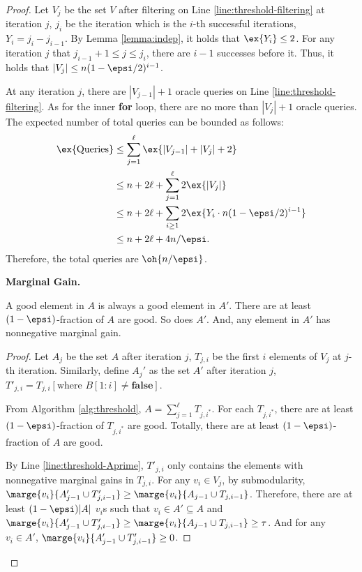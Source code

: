 \begin{proof}
Let $V_j$ be the set $V$ after filtering on Line \ref{line:threshold-filtering} at iteration $j$,
$j_{i}$ be the iteration which is the $i$-th successful iterations,
$Y_i=j_{i}-j_{i-1}$.
By Lemma \ref{lemma:indep}, it holds that $\ex{Y_i} \le 2$.
For any iteration $j$ that $j_{i-1}+1 \le j \le j_i$,
there are $i-1$ successes before it.
Thus, it holds that $|V_j| \le n(1-\epsi/2)^{i-1}$.

At any iteration $j$, there are $|V_{j-1}|+1$ oracle queries on Line \ref{line:threshold-filtering}.
As for the inner \textbf{for} loop, there are no more than $|V_j|+1$ oracle queries.
The expected number of total queries can be bounded as follows:
\begin{align*}
	\ex{\text{Queries}} &\le \sum_{j=1}^{\ell} \ex{|V_{j-1}|+|V_j|+2}\\
	&\le n+2\ell+\sum_{j=1}^{\ell} 2\ex{|V_j|}\\
	&\le n+2\ell+\sum_{i\ge 1} 2\ex{Y_i\cdot n(1-\epsi/2)^{i-1}}\\
	&\le n+2\ell+4n/\epsi.
\end{align*}
Therefore, the total queries are $\oh{n/\epsi}$.

\textbf{Marginal Gain.}
\begin{lemma} \label{lemma:threshold-good}
	A good element in $A$ is always a good element in $A'$. 
	There are at least $(1-\epsi)$-fraction of $A$ are good.
	So does $A'$.
	And, any element in $A'$ has nonnegative marginal gain.
\end{lemma}
\begin{proof}
	Let $A_j$ be the set $A$ after iteration $j$,
	$T_{j,i}$ be the first $i$ elements of $V_j$ at $j$-th iteration.
	Similarly, define $A_j'$ as the set $A'$ after iteration $j$,
	$T'_{j,i}= T_{j,i}[\text{where }B[1:i] \not = \textbf{false}]$.

	From Algorithm \ref{alg:threshold}, $A=\sum_{j=1}^{\ell} T_{j,i^*}$.
	For each $T_{j,i^*}$, there are at least $(1-\epsi)$-fraction of $T_{j,i^*}$ are good.
	Totally, there are at least $(1-\epsi)$-fraction of $A$ are good.

	By Line \ref{line:threshold-Aprime}, $T'_{j,i}$ only contains the elements
	with nonnegative marginal gains in $T_{j,i}$.
	For any $v_i \in V_j$, by submodularity, 
	$\marge{v_i}{A'_{j-1}\cup T'_{j,i-1}}\ge \marge{v_i}{A_{j-1}\cup T_{j,i-1}}$.
	Therefore, there are at least $(1-\epsi)|A|$ $v_i$s such that 
	$v_i \in A' \subseteq A$ and 
	$\marge{v_i}{A'_{j-1}\cup T'_{j,i-1}}\ge \marge{v_i}{A_{j-1}\cup T_{j,i-1}}\ge \tau$.
	And for any $v_i \in A'$, $\marge{v_i}{A'_{j-1}\cup T'_{j,i-1}}\ge 0$.
\end{proof}


\end{proof}
